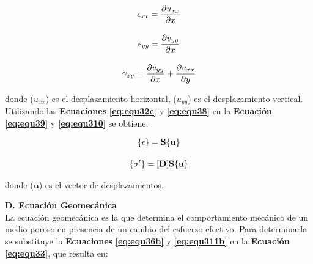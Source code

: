\begin{ceqn} 
\begin{subequations} \label{eq:equ310} 
\begin{gather}
\normalsize{\epsilon_{xx} = \frac{\partial u_{xx}}{\partial x}} \label{eq:equ310a} \\[10pt]
\normalsize{\epsilon_{yy} = \frac{\partial v_{yy}}{\partial x} } \label{eq:equ310b} \\[10pt]
\normalsize{\gamma_{xy} = \frac{\partial v_{yy}}{\partial x} + \frac{\partial u_{xx}}{\partial y} } \label{eq:equ310c}
\end{gather}  
\end{subequations} 
\end{ceqn}
donde ($u_{xx}$) es el desplazamiento horizontal, ($u_{yy}$) es el desplazamiento vertical. Utilizando las \textbf{Ecuaciones} \textbf{\ref{eq:equ32c}} y \textbf{\ref{eq:equ38}} en la \textbf{Ecuación} \textbf{\ref{eq:equ39}} y \textbf{\ref{eq:equ310}} se obtiene:

\begin{ceqn} 
\begin{subequations} \label{eq:equ311} 
\begin{gather}
\normalsize{\{\mathbf{\epsilon}\}=\mathbf{S} \{\mathbf{u}\}} \label{eq:equ311a} \\[10pt]
\normalsize{\{\mathbf{\sigma'}\}=[\mathbf{D}]\mathbf{S}\{\mathbf{u}\}} \label{eq:equ311b}
\end{gather}  
\end{subequations} 
\end{ceqn}
donde ($\mathbf{u}$) es el vector de desplazamientos.\bigskip


\textbf{D. Ecuación Geomecánica}
\\
La ecuación geomecánica es la que determina el comportamiento mecánico de un medio poroso en presencia de un cambio del esfuerzo efectivo. Para determinarla se substituye la \textbf{Ecuaciones} \textbf{\ref{eq:equ36b}} y \textbf{\ref{eq:equ311b}} en la \textbf{Ecuación} \textbf{\ref{eq:equ33}}, que resulta en:

